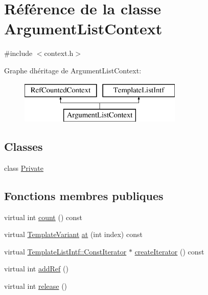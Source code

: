 \hypertarget{class_argument_list_context}{}\section{Référence de la classe Argument\+List\+Context}
\label{class_argument_list_context}


{\ttfamily \#include $<$context.\+h$>$}

Graphe d\textquotesingle{}héritage de Argument\+List\+Context\+:\begin{figure}[H]
\begin{center}
\leavevmode
\includegraphics[height=2.000000cm]{class_argument_list_context}
\end{center}
\end{figure}
\subsection*{Classes}
\begin{DoxyCompactItemize}
\item 
class \hyperlink{class_argument_list_context_1_1_private}{Private}
\end{DoxyCompactItemize}
\subsection*{Fonctions membres publiques}
\begin{DoxyCompactItemize}
\item 
virtual int \hyperlink{class_argument_list_context_a428c0fbb5f44b48bfe74120085122c50}{count} () const 
\item 
virtual \hyperlink{class_template_variant}{Template\+Variant} \hyperlink{class_argument_list_context_a24a10c2afde6d9a0984b0461d12fdad9}{at} (int index) const 
\item 
virtual \hyperlink{class_template_list_intf_1_1_const_iterator}{Template\+List\+Intf\+::\+Const\+Iterator} $\ast$ \hyperlink{class_argument_list_context_acb9a080393b0f917e8fea5685fb3b119}{create\+Iterator} () const 
\item 
virtual int \hyperlink{class_argument_list_context_a378c354cf154e3505e9d5a706ceaea55}{add\+Ref} ()
\item 
virtual int \hyperlink{class_argument_list_context_a7e22b3f45a889508dba94e578c8661f2}{release} ()
\end{DoxyCompactItemize}
